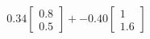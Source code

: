 \documentclass[preview]{standalone}
\begin{document}
\begin{align*}
0.34 \begin{bmatrix} 0.8 \\ 0.5 \end{bmatrix} + -0.40 \begin{bmatrix} 1 \\ 1.6 \end{bmatrix}
\end{align*}
\end{document}
